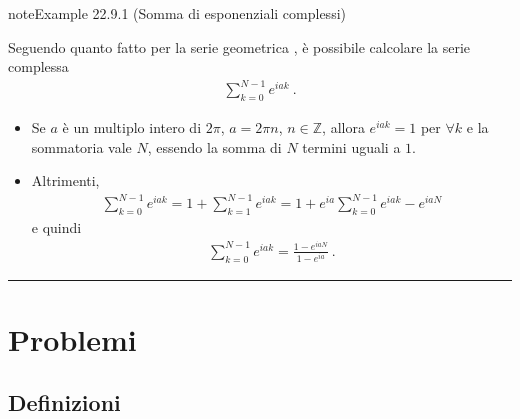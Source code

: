 \documentclass[letterpaper,10pt,italian]{jupyterBook}
\begin{document}
\begin{sphinxadmonition}{note}{Example 22.9.1 (Somma di esponenziali complessi)}



\sphinxAtStartPar
Seguendo quanto fatto per la serie geometrica {\hyperref[\detokenize{ch/series/series-numerical-real:series-geometric}]{}}, è possibile calcolare la serie complessa
\begin{equation*}
\begin{split}\sum_{k=0}^{N-1} e^{i a k} \ .\end{split}
\end{equation*}\begin{itemize}
\item {} 
\sphinxAtStartPar
Se \(a\) è un multiplo intero di \(2 \pi\), \(a = 2 \pi n\), \(n \in \mathbb{Z}\), allora \(e^{i a k} = 1\) per \(\forall k\) e la sommatoria vale \(N\), essendo la somma di \(N\) termini uguali a \(1\).

\item {} 
\sphinxAtStartPar
Altrimenti,
\begin{equation*}
\begin{split}\sum_{k=0}^{N-1} e^{i a k} = 1 + \sum_{k=1}^{N-1} e^{i a k} = 1 + e^{i a} \sum_{k=0}^{N-1} e^{i a k} - e^{i a N} \end{split}
\end{equation*}
\sphinxAtStartPar
e quindi
\begin{equation*}
\begin{split}\sum_{k=0}^{N-1} e^{i a k} = \frac{1 - e^{i a N}}{1 - e^{i a}} \ .\end{split}
\end{equation*}
\end{itemize}
\end{sphinxadmonition}


\bigskip\hrule\bigskip


\sphinxstepscope


\section{Problemi}
\label{\detokenize{ch/algebra/complex-algebra-problems:problemi}}\label{\detokenize{ch/algebra/complex-algebra-problems:math-hs-algebra-complex-problems}}\label{\detokenize{ch/algebra/complex-algebra-problems::doc}}

\subsection{Definizioni}
\label{\detokenize{ch/algebra/complex-algebra-problems:definizioni}}\label{\detokenize{ch/algebra/complex-algebra-problems:math-hs-algebra-complex-problems-def}}
\sphinxAtStartPar
{}
\end{document}
